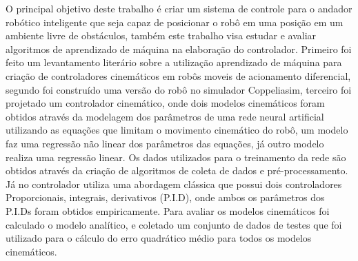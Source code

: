 %
%

O principal objetivo deste trabalho é criar um  sistema de
controle para o andador robótico inteligente que seja capaz de
posicionar o robô em uma posição em um ambiente livre de obstáculos,
também  este trabalho visa estudar e avaliar algoritmos de aprendizado
de máquina na elaboração do controlador. Primeiro foi feito um levantamento
literário sobre a utilização aprendizado de máquina para criação de
controladores cinemáticos em robôs moveis de acionamento diferencial,
segundo foi construído uma versão do robô no simulador Coppeliasim,
terceiro foi projetado um controlador cinemático, onde dois modelos
cinemáticos foram obtidos através da modelagem dos parâmetros de uma
rede neural artificial utilizando as equações que limitam o movimento
cinemático do robô, um modelo faz uma regressão não linear dos
parâmetros das equações, já outro modelo realiza uma regressão linear.
Os dados utilizados para o treinamento da rede são obtidos
através da criação de  algoritmos de coleta de dados e pré-processamento.
Já no controlador utiliza uma abordagem
clássica que possui  dois controladores
Proporcionais, integrais, derivativos (P.I.D),
onde ambos os parâmetros dos P.I.Ds foram obtidos empiricamente.
Para avaliar os modelos cinemáticos foi calculado o modelo analítico,
e coletado um conjunto de
dados de testes que foi utilizado para o cálculo do erro quadrático
médio para todos os modelos cinemáticos.
